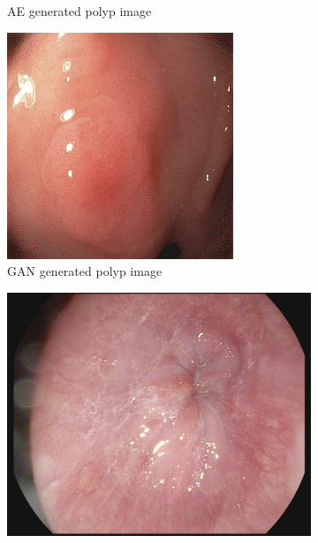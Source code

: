 \begin{figure}[h]
\begin{subfigure}[t]{\myfigsizethree}
            \caption{AE generated polyp image}    
            \label{fig:polyp_AE_CORNER1}
        \end{subfigure}
        \qquad
        \begin{subfigure}[t]{\myfigsizethree}  
            \centering 
            \includegraphics[width=\textwidth]{experiments/figures/blackcorner/polypGAN.jpg}
            \caption{GAN generated polyp image}    
            \label{fig:polyp_GAN_CORNER1}
        \end{subfigure}
        \qquad\vfill
       	\begin{subfigure}[t]{\myfigsizethree}   
            \centering 
            \includegraphics[height=\textwidth,width=\textwidth]{experiments/figures/blackcorner/zORIG.jpg}

\end{subfigure}
\end{figure}
